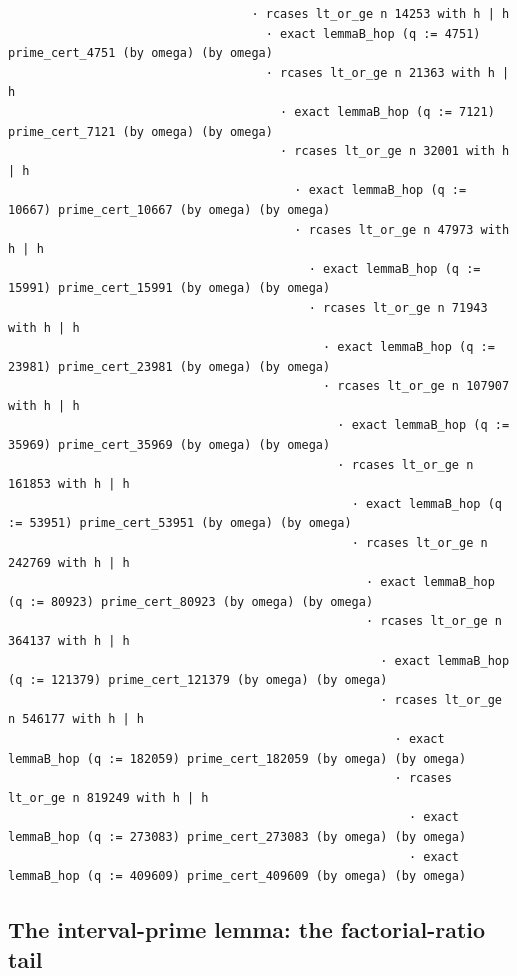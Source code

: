 \documentclass[11pt]{article}
\theoremstyle{definition}
\begin{document}
\begin{lstlisting}
                                  · rcases lt_or_ge n 14253 with h | h
                                    · exact lemmaB_hop (q := 4751) prime_cert_4751 (by omega) (by omega)
                                    · rcases lt_or_ge n 21363 with h | h
                                      · exact lemmaB_hop (q := 7121) prime_cert_7121 (by omega) (by omega)
                                      · rcases lt_or_ge n 32001 with h | h
                                        · exact lemmaB_hop (q := 10667) prime_cert_10667 (by omega) (by omega)
                                        · rcases lt_or_ge n 47973 with h | h
                                          · exact lemmaB_hop (q := 15991) prime_cert_15991 (by omega) (by omega)
                                          · rcases lt_or_ge n 71943 with h | h
                                            · exact lemmaB_hop (q := 23981) prime_cert_23981 (by omega) (by omega)
                                            · rcases lt_or_ge n 107907 with h | h
                                              · exact lemmaB_hop (q := 35969) prime_cert_35969 (by omega) (by omega)
                                              · rcases lt_or_ge n 161853 with h | h
                                                · exact lemmaB_hop (q := 53951) prime_cert_53951 (by omega) (by omega)
                                                · rcases lt_or_ge n 242769 with h | h
                                                  · exact lemmaB_hop (q := 80923) prime_cert_80923 (by omega) (by omega)
                                                  · rcases lt_or_ge n 364137 with h | h
                                                    · exact lemmaB_hop (q := 121379) prime_cert_121379 (by omega) (by omega)
                                                    · rcases lt_or_ge n 546177 with h | h
                                                      · exact lemmaB_hop (q := 182059) prime_cert_182059 (by omega) (by omega)
                                                      · rcases lt_or_ge n 819249 with h | h
                                                        · exact lemmaB_hop (q := 273083) prime_cert_273083 (by omega) (by omega)
                                                        · exact lemmaB_hop (q := 409609) prime_cert_409609 (by omega) (by omega)
\end{lstlisting}

\subsection{The interval-prime lemma: the factorial-ratio tail}
\end{document}
